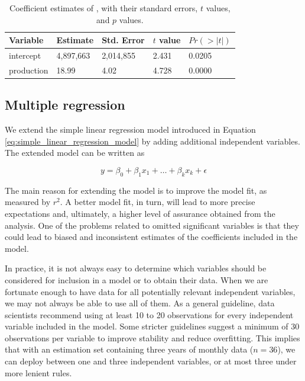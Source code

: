 \begin{table}[htbp]
\begin{tabularx}{\textwidth}{X Z{2cm} Z{2cm} Z{1.5cm} Z{1.5cm}}
\toprule
Variable &
Estimate &
Std. Error &
$t$ value &
$Pr(>|t|)$ \\
\midrule
intercept  & 4,897,663 & 2,014,855 & 2.431 & 0.0205 \\
production &     18.99 &      4.02 & 4.728 & 0.0000 \\
\bottomrule
\end{tabularx}
\caption{Coefficient estimates of , with their standard errors, $t$ values, and $p$ values.}
\label{tab:summary_mod_0}
\end{table}



\subsection{Multiple regression} %
\label{sub:multiple_regression}

We extend the simple linear regression model introduced in Equation \ref{eq:simple_linear_regression_model} by adding additional independent variables. The extended model can be written as

\begin{equation}
 y = \beta_0 + \beta_1x_1+ \ldots + \beta_kx_k+ \epsilon
 \label{eq:multiple_linear_regression_model} 
\end{equation}

The main reason for extending the model is to improve the model fit, as measured by $r^2$. A better model fit, in turn, will lead to more precise expectations and, ultimately, a higher level of assurance obtained from the analysis. One of the problems related to omitted significant variables is that they could lead to biased and inconsistent estimates of the coefficients included in the model.

In practice, it is not always easy to determine which variables should be considered for inclusion in a model or to obtain their data. When we are fortunate enough to have data for all potentially relevant independent variables, we may not always be able to use all of them. As a general guideline, data scientists recommend using at least 10 to 20 observations for every independent variable included in the model. Some stricter guidelines suggest a minimum of 30 observations per variable to improve stability and reduce overfitting. This implies that with an estimation set containing three years of monthly data ($n = 36$), we can deploy between one and three independent variables, or at most three under more lenient rules. 

